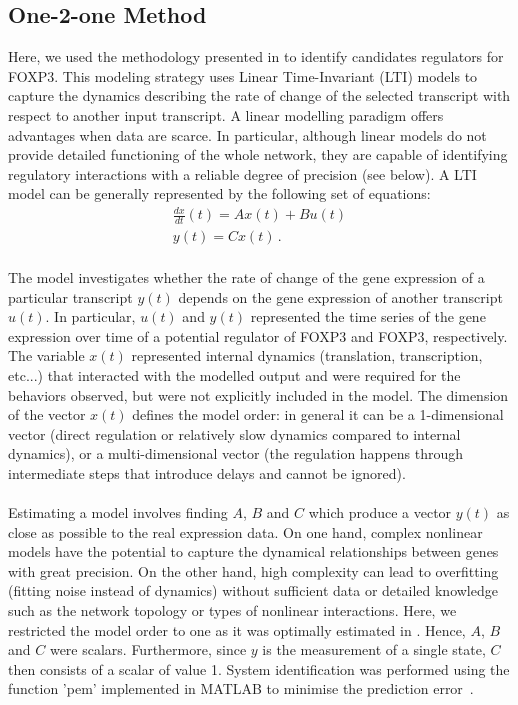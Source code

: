 \documentclass[oneside, 10pt, a4paper, twocolumn]{article}
\begin{document}
\subsection{One-2-one Method}
\label{SISubSection:One-2-one}

{Here, we used the methodology presented in \citep{Mombaerts2019} to identify candidates regulators for FOXP3. This modeling strategy uses Linear Time-Invariant (LTI) models to capture the dynamics describing the rate of change of the selected transcript with respect to another input transcript. A linear modelling paradigm offers advantages when data are scarce. In particular, although linear models do not provide detailed functioning of the whole network, they are capable of identifying regulatory interactions with a reliable degree of precision (see below). A LTI model can be generally represented by the following set of equations:
\begin{equation}
\begin{array}{l}
\frac{dx}{dt}(t) = A x(t) + B u(t) \\
    y(t) = Cx(t) \, .
\end{array}
\label{SI:Eq:LTImodel}
\end{equation}\\
The model investigates whether the rate of change of the gene expression of a particular transcript $y(t)$ depends on the gene expression of another transcript $u(t)$. In particular, $u(t)$ and $y(t)$ represented the time series of the gene expression over time of a potential regulator of FOXP3 and FOXP3, respectively. The variable $x(t)$ represented internal dynamics (translation, transcription, etc...) that interacted with the modelled output and were required for the behaviors observed, but were not explicitly included in the model. The dimension of the vector $x(t)$ defines the model order: in general it can be a 1-dimensional vector (direct regulation or relatively slow dynamics compared to internal dynamics), or a multi-dimensional vector (the regulation happens through intermediate steps that introduce delays and cannot be ignored). 
\\ \\
Estimating a model involves finding $A$, $B$ and $C$ which produce a vector $y(t)$ as close as possible to the real expression data. On one hand, complex nonlinear models have the potential to capture the dynamical relationships between genes with great precision. On the other hand, high complexity can lead to overfitting (fitting noise instead of dynamics) without sufficient data or detailed knowledge such as the network topology or types of nonlinear interactions. Here, we restricted the model order to one as it was optimally estimated in \citep{Mombaerts2019}. Hence, $A$, $B$ and $C$ were scalars. Furthermore, since $y$ is the measurement of a single state, $C$ then consists of a scalar of value 1. System identification was performed using the function 'pem' implemented in MATLAB to minimise the prediction \mbox{error \citep{Ljung1998}.} \\ \\
}
\end{document}
